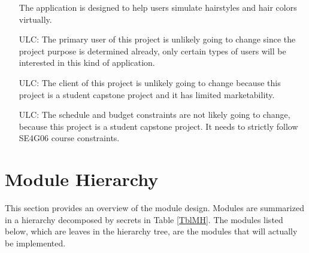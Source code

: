 \documentclass[12pt, titlepage]{article}
\newcounter{ucnum}
\begin{document}
\begin{itemize}
The application is designed to help users simulate hairstyles and hair colors virtually.
\item[ULC\refstepcounter{ucnum}\theucnum\label{ULC_meaningfulLabel}:] 
The primary user of this project is unlikely going to change since the project purpose is determined already, only certain types of users will be interested in this kind of application.
\item[ULC\refstepcounter{ucnum}\theucnum\label{ULC_meaningfulLabel}:] 
The client of this project is unlikely going to change because this project is a student capstone project and it has limited marketability.
\item[ULC\refstepcounter{ucnum}\theucnum\label{ULC_meaningfulLabel}:] 
The schedule and budget constraints are not likely going to change, because this project is a student capstone project. It needs to strictly follow SE4G06 course constraints.








\end{itemize}

\section{Module Hierarchy} \label{SecMH}

This section provides an overview of the module design. Modules are summarized
in a hierarchy decomposed by secrets in Table \ref{TblMH}. The modules listed
below, which are leaves in the hierarchy tree, are the modules that will
actually be implemented.
\end{document}
